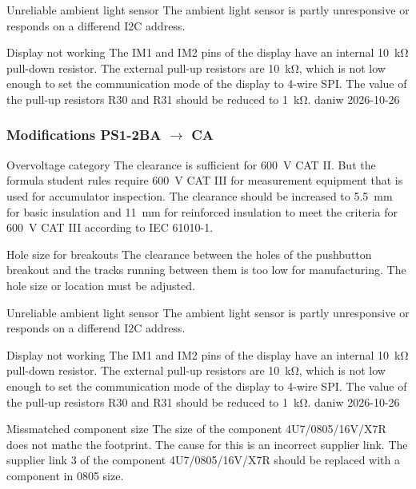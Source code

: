 \begin{ModTable}

\ModItemOpen
{Unreliable ambient light sensor}
{The ambient light sensor is partly unresponsive or responds on a differend \ac{I2C} address. }
{}
{}
{}

\ModItemDone
{Display not working}
{The IM1 and IM2 pins of the display have an internal \qty{10}{\kilo\ohm} pull-down resistor. The external pull-up resistors are \qty{10}{\kilo\ohm}, which is not low enough to set the communication mode of the display to 4-wire \ac{SPI}. }
{The value of the pull-up resistors R30 and R31 should be reduced to \qty{1}{\kilo\ohm}. }
{daniw}
{2026-10-26}

\end{ModTable}

\FloatBarrier

\subsubsection{Modifications PS1-2BA $\to$ CA}

\begin{ModTable}

\ModItemOpen
{Overvoltage category}
{The clearance is sufficient for \qty{600}{\volt} CAT II. But the formula student rules \cite{FSG:Rules_2026} require \qty{600}{\volt} CAT III for measurement equipment that is used for accumulator inspection. }
{The clearance should be increased to \qty{5.5}{\milli\meter} for basic insulation and \qty{11}{\milli\meter} for reinforced insulation to meet the criteria for \qty{600}{\volt} CAT III according to IEC 61010-1. }
{}
{}

\ModItemOpen
{Hole size for breakouts}
{The clearance between the holes of the pushbutton breakout and the tracks running between them is too low for manufacturing. }
{The hole size or location must be adjusted. }
{}
{}

\ModItemOpen
{Unreliable ambient light sensor}
{The ambient light sensor is partly unresponsive or responds on a differend \ac{I2C} address. }
{}
{}
{}

\ModItemDone
{Display not working}
{The IM1 and IM2 pins of the display have an internal \qty{10}{\kilo\ohm} pull-down resistor. The external pull-up resistors are \qty{10}{\kilo\ohm}, which is not low enough to set the communication mode of the display to 4-wire \ac{SPI}. }
{The value of the pull-up resistors R30 and R31 should be reduced to \qty{1}{\kilo\ohm}. }
{daniw}
{2026-10-26}

\ModItemOpen
{Missmatched component size}
{The size of the component 4U7/0805/16V/X7R does not mathc the footprint. The cause for this is an incorrect supplier link. }
{The supplier link 3 of the component 4U7/0805/16V/X7R should be replaced with a component in 0805 size. }
{}
{}

\end{ModTable}

